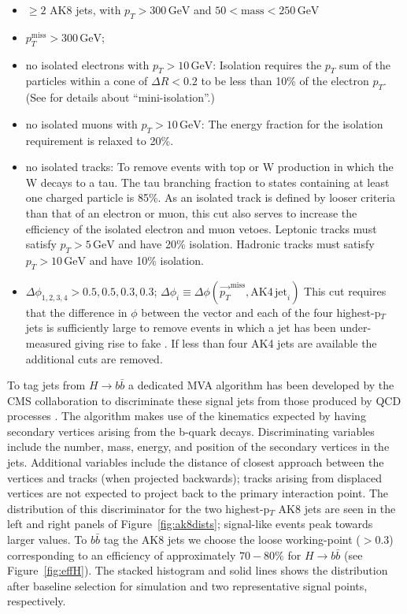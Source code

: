 \begin{itemize}
\item $\geq2$ AK8 jets, with $p_{T} > 300\,\mathrm{GeV}$ and $50 < \mathrm{mass} < 250\,\mathrm{GeV}$
\item $p_{T}^{\mathrm{miss}} > 300\,\mathrm{GeV}$;
\item no isolated electrons with $p_{T}>10\,\textrm{GeV}$:\newline
Isolation requires the $p_{T}$ sum of the particles within a cone of $\Delta R < 0.2$ to be less than 10\% of the electron $p_{T}$. (See \cite{miniiso} for details about ``mini-isolation''.)
\item no isolated muons with $p_{T}>10\,\textrm{GeV}$:\newline
The energy fraction for the isolation requirement is relaxed to 20\%.
\item no isolated tracks:\newline
To remove events with top or W production in which the W decays to a tau. The tau branching fraction to states containing at least one charged particle is 85\%. As an isolated track is defined by looser criteria than that of an electron or muon, this cut also serves to increase the efficiency of the isolated electron and muon vetoes. Leptonic tracks must satisfy $p_{T}>5\,\textrm{GeV}$ and have 20\% isolation. Hadronic tracks must satisfy $p_{T}>10\,\textrm{GeV}$ and have 10\% isolation.
\item $\Delta\phi_{1, 2, 3, 4} > 0.5, 0.5, 0.3, 0.3$; $\Delta\phi_{i}\equiv \Delta\phi(\vec{p_{T}}^{\mathrm{miss}}, \mathrm{AK4\,jet}_{i})$\newline
This cut requires that the difference in $\phi$ between the \ptmiss vector and each of the four highest-p$_{T}$ jets is sufficiently large to remove events in which a jet has been under-measured giving rise to fake \ptmiss. If less than four AK4 jets are available the additional cuts are removed.
\end{itemize}

To tag jets from $H \rightarrow b\bar{b}$ a dedicated MVA algorithm has been developed by the CMS collaboration to discriminate these signal jets from those produced by QCD processes \cite{bbtagger}. The algorithm makes use of the kinematics expected by having secondary vertices arising from the b-quark decays. Discriminating variables include the number, mass, energy, and position of the secondary vertices in the jets. Additional variables include the distance of closest approach between the vertices and tracks (when projected backwards); tracks arising from displaced vertices are not expected to project back to the primary interaction point. The distribution of this discriminator for the two highest-p$_{T}$ AK8 jets are seen in the left and right panels of Figure~\ref{fig:ak8dists}; signal-like events peak towards larger values. To $b\bar{b}$ tag the AK8 jets we choose the loose working-point ($>$0.3) corresponding to an efficiency of approximately $70-80\%$ for $H \rightarrow b \bar{b}$ (see Figure~\ref{fig:effH}). The stacked histogram and solid lines shows the distribution after baseline selection for simulation and two representative signal points, respectively.

